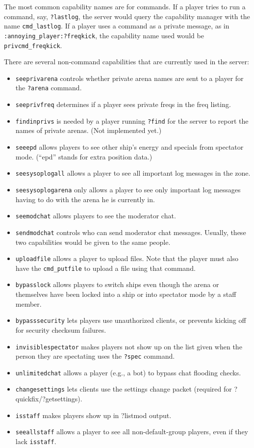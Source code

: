 \documentclass{article}
\begin{document}
The most common capability names are for commands. If a player tries to
run a command, say, \verb/?lastlog/, the server would query the
capability manager with the name \verb/cmd_lastlog/. If a player uses a
command as a private message, as in \verb/:annoying_player:?freqkick/,
the capability name used would be \verb/privcmd_freqkick/.

There are several non-command capabilities that are currently used in
the server:

\begin{itemize}
\item{\texttt{seeprivarena}} controls whether private arena names are
sent to a player for the \verb/?arena/ command.
\item{\texttt{seeprivfreq}} determines if a player sees private freqs in
the freq listing.
\item{\texttt{findinprivs}} is needed by a player running \verb/?find/
for the server to report the names of private arenas. (Not implemented
yet.)
\item{\texttt{seeepd}} allows players to see other ship's energy and
specials from spectator mode. (``epd'' stands for extra position data.)
\item{\texttt{seesysoplogall}} allows a player to see all important log
messages in the zone.
\item{\texttt{seesysoplogarena}} only allows a player to see only
important log messages having to do with the arena he is currently in.
\item{\texttt{seemodchat}} allows players to see the moderator chat.
\item{\texttt{sendmodchat}} controls who can send moderator chat
messages. Usually, these two capabilities would be given to the same
people.
\item{\texttt{uploadfile}} allows a player to upload files. Note that
the player must also have the \texttt{cmd\_putfile} to upload a file
using that command.
\item{\texttt{bypasslock}} allows players to switch ships even though
the arena or themselves have been locked into a ship or into spectator
mode by a staff member.
\item{\texttt{bypasssecurity}} lets players use unauthorized clients, or
prevents kicking off for security checksum failures.
\item{\texttt{invisiblespectator}} makes players not show up on the list
given when the person they are spectating uses the \verb/?spec/ command.
\item{\texttt{unlimitedchat}} allows a player (e.g., a bot) to bypass
chat flooding checks.
\item{\texttt{changesettings}} lets clients use the settings change
packet (required for ?quickfix/?getsettings).
\item{\texttt{isstaff}} makes players show up in ?listmod output.
\item{\texttt{seeallstaff}} allows a player to see all non-default-group
players, even if they lack \texttt{isstaff}.
\end{itemize}
\end{document}
